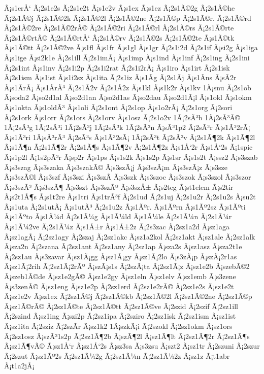 {Ã¡s1erÅ‘
Ã¡2s1e2s
Ã¡2s1e2t
Ã¡s1e2v
Ã¡s1ex
Ã¡s1ez
Ã¡2s1Ã©2g
Ã¡2s1Ã©he
Ã¡2s1Ã©j
Ã¡2s1Ã©2k
Ã¡2s1Ã©2l
Ã¡2s1Ã©2ne
Ã¡2s1Ã©p
Ã¡2s1Ã©r.
Ã¡2s1Ã©rd
Ã¡2s1Ã©2re
Ã¡2s1Ã©2rÃ©
Ã¡2s1Ã©2ri
Ã¡2s1Ã©rl
Ã¡2s1Ã©rs
Ã¡2s1Ã©rte
Ã¡2s1Ã©rtÃ©
Ã¡2s1Ã©rtÅ‘
Ã¡2s1Ã©rv
Ã¡2s1Ã©2s
Ã¡2s1Ã©2te
Ã¡s1Ã©tk
Ã¡s1Ã©tt
Ã¡2s1Ã©2ve
Ã¡s1fl
Ã¡s1fr
Ã¡s1gl
Ã¡s1gr
Ã¡2s1i2d
Ã¡2s1if
Ã¡si2g
Ã¡s1iga
Ã¡s1ige
Ã¡si2k1e
Ã¡2s1ill
Ã¡2s1imÃ¡
Ã¡s1imp
Ã¡s1ind
Ã¡s1inf
Ã¡2s1ing
Ã¡2s1ini
Ã¡2s1int
Ã¡s1inv
Ã¡2s1i2p
Ã¡2s1i2rat
Ã¡2s1i2rÃ¡
Ã¡s1iro
Ã¡s1irt
Ã¡2s1isk
Ã¡2s1ism
Ã¡s1ist
Ã¡s1i2sz
Ã¡s1ita
Ã¡2s1iz
Ã¡s1Ã­g
Ã¡2s1Ã­j
Ã¡s1Ã­ns
Ã¡sÃ­2r
Ã¡s1Ã­rÃ¡
Ã¡s1Ã­rÃ³
Ã¡2s1Ã­2v
Ã¡2s1Ã­2z
Ã¡s1kl
Ã¡s1k2r
Ã¡s1kv
1Ã¡snu
Ã¡2s1ob
Ã¡soda2
Ã¡so2d1al
Ã¡so2d1an
Ã¡so2d1as
Ã¡so2dau
Ã¡so2d1Ã¡l
Ã¡s1okl
Ã¡s1okm
Ã¡s1okta
Ã¡s1oldÃ³
Ã¡s1oli
Ã¡2s1ont
Ã¡2s1op
Ã¡s1o2rÃ¡
Ã¡2s1org
Ã¡2sori
Ã¡2s1ork
Ã¡s1orr
Ã¡2s1ors
Ã¡2s1orv
Ã¡s1osz
Ã¡2s1o2v
1Ã¡2sÃ³b
1Ã¡2sÃ³Ã©
1Ã¡2sÃ³g
1Ã¡2sÃ³i
1Ã¡2sÃ³j
1Ã¡2sÃ³k
1Ã¡2sÃ³n
Ã¡sÃ³1p2
Ã¡2sÃ³r
Ã¡s1Ã³2rÃ¡
Ã¡s1Ã³ri
1Ã¡sÃ³rÃ³
Ã¡2sÃ³s
Ã¡s1Ã³2sÃ¡
1Ã¡2sÃ³t
Ã¡2sÃ³v
Ã¡2s1Ã¶2k
Ã¡s1Ã¶2l
Ã¡s1Ã¶n
Ã¡2s1Ã¶2r
Ã¡2s1Ã¶s
Ã¡s1Ã¶2v
Ã¡2s1Ã¶2z
Ã¡s1Å‘2r
Ã¡s1Å‘2s
Ã¡1spic
Ã¡s1p2l
Ã¡1s2pÃ³r
Ã¡sp2r
Ã¡s1ps
Ã¡s1s2k
Ã¡s1s2p
Ã¡s1sr
Ã¡s1s2t
Ã¡ssz2
Ã¡s3szab
Ã¡s3szag
Ã¡s3szaka
Ã¡s3szakÃ©
Ã¡s3szÃ¡j
Ã¡s3szÃ¡m
Ã¡s3szÃ¡z
Ã¡s3sze
Ã¡s3szÃ©l
Ã¡s3szf
Ã¡s3szi
Ã¡s3szÃ­
Ã¡s3szk
Ã¡s3szoc
Ã¡s3szok
Ã¡s3szol
Ã¡s3szor
Ã¡s3szÃ³
Ã¡s3szÃ¶
Ã¡s3szt
Ã¡s3szÃº
Ã¡s3szÅ±
Ã¡s2teg
Ã¡st1elem
Ã¡s2tir
Ã¡s2t1Ã¶s
Ã¡s1t2re
Ã¡s1tri
Ã¡s1trÃ³f
Ã¡2s1ud
Ã¡2s1uj
Ã¡2s1u2r
Ã¡2s1u2s
Ã¡su2t
Ã¡s1uta
Ã¡2s1utÃ¡
Ã¡s1utÃ³
Ã¡2s1u2z
Ã¡s1Ãºr.
Ã¡s1Ãºrn
Ã¡s1Ãº2sz
Ã¡s1Ãºti
Ã¡s1Ãºto
Ã¡s1Ã¼d
Ã¡2s1Ã¼g
Ã¡s1Ã¼ld
Ã¡s1Ã¼le
Ã¡2s1Ã¼n
Ã¡2s1Ã¼r
Ã¡s1Ã¼2ve
Ã¡2s1Ã¼z
Ã¡s1Å±r
Ã¡s1Å±2z
Ã¡2s3zac
Ã¡2sz1a2d
Ã¡sz1aga
Ã¡sz1agÃ¡
Ã¡2sz1agy
Ã¡2szaj
Ã¡2sz1akc
Ã¡sz1a2kol
Ã¡2sz1akt
Ã¡sz1ale
Ã¡2sz1alk
Ã¡sza2n
Ã¡2szana
Ã¡2sz1ant
Ã¡2sz1any
Ã¡2sz1ap
Ã¡sza2s
Ã¡sz1asz
Ã¡sza2t1e
Ã¡2sz1au
Ã¡s3zavar
Ã¡sz1Ã¡gg
Ã¡sz1Ã¡gy
Ã¡sz1Ã¡2lo
Ã¡s3zÃ¡p
Ã¡szÃ¡2r1as
Ã¡sz1Ã¡2rih
Ã¡2sz1Ã¡2rÃº
Ã¡szÃ¡s1s
Ã¡2szÃ¡ta
Ã¡2sz1Ã¡z
Ã¡sz1e2b
Ã¡szebÃ©2
Ã¡szeb1Ã©de
Ã¡sz1e2gÃ©
Ã¡sz1e2gy
Ã¡sz1eln
Ã¡sz1elv
Ã¡sz1emb
Ã¡s3zene
Ã¡s3zenÃ©
Ã¡sz1eng
Ã¡sz1e2p
Ã¡2sz1erd
Ã¡2sz1e2rÃ©
Ã¡2sz1e2s
Ã¡sz1e2t
Ã¡sz1e2v
Ã¡sz1ex
Ã¡2sz1Ã©j
Ã¡2sz1Ã©kb
Ã¡2sz1Ã©2l
Ã¡2sz1Ã©2ne
Ã¡2sz1Ã©p
Ã¡sz1Ã©rÃ©
Ã¡2sz1Ã©te
Ã¡2sz1Ã©tt
Ã¡2sz1Ã©ve
Ã¡2szid
Ã¡2szif
Ã¡2sz1ill
Ã¡2szind
Ã¡sz1ing
Ã¡szi2p
Ã¡2sz1ipa
Ã¡2sziro
Ã¡2sz1isk
Ã¡2sz1ism
Ã¡sz1ist
Ã¡sz1ita
Ã¡2sziz
Ã¡2szÃ­r
Ã¡sz1k2
1Ã¡szkÃ¡i
Ã¡2szokl
Ã¡2sz1okm
Ã¡sz1ors
Ã¡2sz1osz
Ã¡szÃ³1s2p
Ã¡2sz1Ã¶2b
Ã¡szÃ¶2l
Ã¡sz1Ã¶lt
Ã¡2sz1Ã¶2r
Ã¡2sz1Ã¶s
Ã¡sz1Ã¶vÃ©
Ã¡sz1Å‘r
Ã¡sz1Å‘2s
Ã¡sz3sa
Ã¡s3zsu
Ã¡szt2
Ã¡sz1tr
Ã¡2szuni
Ã¡2szur
Ã¡2szut
Ã¡sz1Ãº2s
Ã¡2sz1Ã¼2g
Ã¡2sz1Ã¼n
Ã¡2sz1Ã¼2z
Ã¡sz1z
Ã¡t1abr
Ã¡t1a2jÃ¡
}
